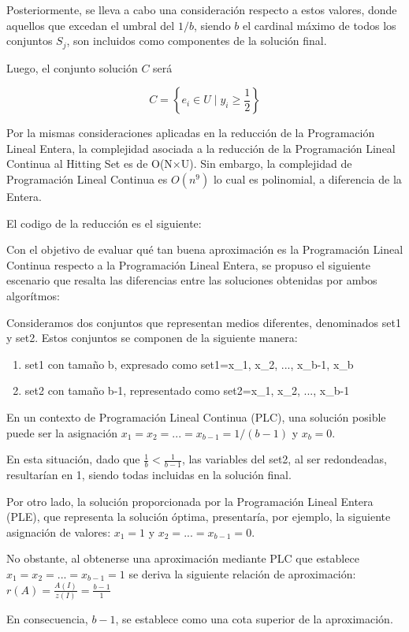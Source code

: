 Posteriormente, se lleva a cabo una consideración respecto a estos valores, donde aquellos que excedan el umbral del $1/b$, siendo $b$ el cardinal máximo de todos los conjuntos $S_j$, son incluidos como componentes de la solución final.

Luego, el conjunto solución $C$ será

\[
    C = \left\{e_i \in U \mid y_{i} \geq \frac{1}{2}\right\}
\]

Por la mismas consideraciones aplicadas en la reducción de la Programación Lineal Entera, la complejidad asociada a la reducción de la Programación Lineal Continua al Hitting Set es de O(N×U).
Sin embargo, la complejidad de Programación Lineal Continua es $O(n^9)$ lo cual es polinomial, a diferencia de la Entera. 

El codigo de la reducción es el siguiente:



Con el objetivo de evaluar qué tan buena aproximación es la Programación Lineal Continua respecto a la Programación Lineal Entera, se propuso el siguiente escenario que resalta las diferencias entre las soluciones obtenidas por ambos algorítmos:

Consideramos dos conjuntos que representan medios diferentes, denominados set1 y set2. Estos conjuntos se componen de la siguiente manera:
\begin{enumerate}
    \item set1 con tamaño b, expresado como set1={x_1, x_2, ..., x_{b-1},  x_b}
    \item set2 con tamaño b-1, representado como set2={x_1, x_2, ..., x_{b-1}}
\end{enumerate}

En un contexto de Programación Lineal Continua (PLC), una solución posible puede ser la asignación $x_1 = x_2 = ... = x_{b-1} = 1/(b-1)$ y $x_b=0$.

En esta situación, dado que $\frac{1}{b} < \frac{1}{b-1}$, las variables del set2, al ser redondeadas, resultarían en 1, siendo todas incluidas en la solución final.

Por otro lado, la solución proporcionada por la Programación Lineal Entera (PLE), que representa la solución óptima, presentaría, por ejemplo, la siguiente asignación de valores:  $x_1 = 1$ y  $x_2 = ... = x_{b-1} = 0$. 

No obstante, al obtenerse una aproximación mediante PLC que establece $x_1 = x_2 = ... = x_{b-1} = 1$ se deriva la siguiente relación de aproximación: $r(A)=\frac{A(I)}{z(I)}=\frac{b-1}{1}$

En consecuencia, $b−1$, se establece como una cota superior de la aproximación. 


